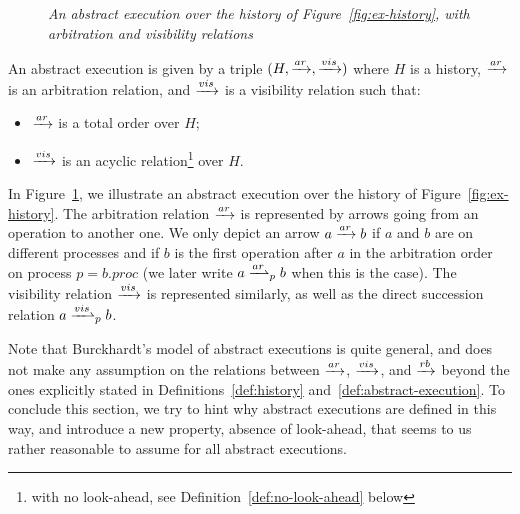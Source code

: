 \begin{figure}[t]
\begin{center}

\end{center}
\caption{\small \slshape An abstract execution over the history of Figure~\ref{fig:ex-history}, with arbitration and visibility relations}
\label{fig:ex-abstract-execution}
\end{figure}


\begin{definition}\label{def:abstract-execution}
  An abstract execution is given by a triple \mbox{$(H,\xrightarrow{ar},\xrightarrow{vis})$} where $H$ is a history, $\xrightarrow{ar}$ is an arbitration relation, and $\xrightarrow{vis}$ is a visibility relation such that:
  \begin{itemize}
    \item $\xrightarrow{ar}$ is a total order over $H$;
    \item $\xrightarrow{vis}$ is an acyclic relation\footnote{with no look-ahead, see Definition~\ref{def:no-look-ahead} below} over $H$.    
  \end{itemize}
\end{definition}

\begin{example}
  In Figure~\ref{fig:ex-abstract-execution}, we illustrate an abstract execution over the history of Figure~\ref{fig:ex-history}. The arbitration relation $\xrightarrow{ar}$ is represented by arrows going from an operation to another one. We only depict an arrow $a\xrightarrow{ar} b$ if $a$ and $b$ are on different processes and if $b$ is the first operation after $a$ in the arbitration order on process $p = b.proc$ (we later write $\opa \succrl{p}{ar} \opb$ when this is the case). The visibility relation $\xrightarrow{vis}$ is represented similarly, as well as the direct succession relation $\opa\succrl{p}{vis}\opb$.
\end{example}

Note that Burckhardt's model of abstract executions is quite general, and does not make any assumption on the relations between $\xrightarrow{ar}$, $\xrightarrow{vis}$, and $\xrightarrow{rb}$ beyond the ones explicitly stated in Definitions~\ref{def:history} and~\ref{def:abstract-execution}. To conclude this section, we try to hint why abstract executions are defined in this way, and introduce a new property, absence of look-ahead, that seems to us rather reasonable to assume for all abstract executions.


